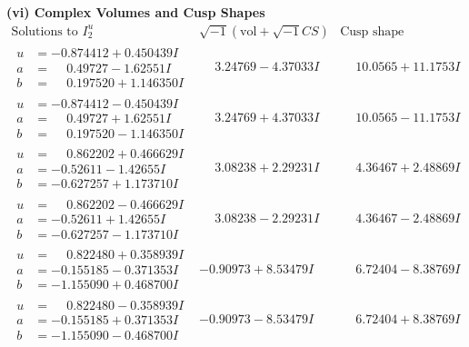 \documentclass[1p]{elsarticle_modified}
\theoremstyle{definition}
\newcommand{\I}{\sqrt{-1}}
\begin{document}
\newpage\flushleft \textbf{(vi) Complex Volumes and Cusp Shapes}
$$\begin{array}{c|c|c}  
\text{Solutions to }I^u_{2}& \I (\text{vol} + \sqrt{-1}CS) & \text{Cusp shape}\\
 \hline 
\begin{aligned}
u &= -0.874412 + 0.450439 I \\
a &= \phantom{-}0.49727 - 1.62551 I \\
b &= \phantom{-}0.197520 + 1.146350 I\end{aligned}
 & \phantom{-}3.24769 - 4.37033 I & \phantom{-}10.0565 + 11.1753 I \\ \hline\begin{aligned}
u &= -0.874412 - 0.450439 I \\
a &= \phantom{-}0.49727 + 1.62551 I \\
b &= \phantom{-}0.197520 - 1.146350 I\end{aligned}
 & \phantom{-}3.24769 + 4.37033 I & \phantom{-}10.0565 - 11.1753 I \\ \hline\begin{aligned}
u &= \phantom{-}0.862202 + 0.466629 I \\
a &= -0.52611 - 1.42655 I \\
b &= -0.627257 + 1.173710 I\end{aligned}
 & \phantom{-}3.08238 + 2.29231 I & \phantom{-}4.36467 + 2.48869 I \\ \hline\begin{aligned}
u &= \phantom{-}0.862202 - 0.466629 I \\
a &= -0.52611 + 1.42655 I \\
b &= -0.627257 - 1.173710 I\end{aligned}
 & \phantom{-}3.08238 - 2.29231 I & \phantom{-}4.36467 - 2.48869 I \\ \hline\begin{aligned}
u &= \phantom{-}0.822480 + 0.358939 I \\
a &= -0.155185 - 0.371353 I \\
b &= -1.155090 + 0.468700 I\end{aligned}
 & -0.90973 + 8.53479 I & \phantom{-}6.72404 - 8.38769 I \\ \hline\begin{aligned}
u &= \phantom{-}0.822480 - 0.358939 I \\
a &= -0.155185 + 0.371353 I \\
b &= -1.155090 - 0.468700 I\end{aligned}
 & -0.90973 - 8.53479 I & \phantom{-}6.72404 + 8.38769 I \\ \hline\begin{aligned}

\end{aligned}
\end{array}$$
\end{document}

